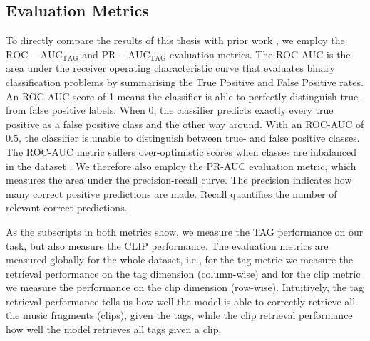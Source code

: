 \subsection{Evaluation Metrics}
To directly compare the results of this thesis with prior work \cite{dieleman2014end,lee2018samplecnn,pons_end--end_2017}, we employ the $\mathrm{ROC-AUC}_{\mathrm{TAG}}$ and $\mathrm{PR-AUC}_{\mathrm{TAG}}$ evaluation metrics. The ROC-AUC is the area under the receiver operating characteristic curve that evaluates binary classification problems by summarising the True Positive and False Positive rates. An ROC-AUC score of 1 means the classifier is able to perfectly distinguish true- from false positive labels. When 0, the classifier predicts exactly every true positive as a false positive class and the other way around. With an ROC-AUC of 0.5, the classifier is unable to distinguish between true- and false positive classes. The ROC-AUC metric suffers over-optimistic scores when classes are inbalanced in the dataset \cite{rocaucimbalance}. We therefore also employ the PR-AUC evaluation metric, which measures the area under the precision-recall curve. The precision indicates how many correct positive predictions are made. Recall quantifies the number of relevant correct predictions.

As the subscripts in both metrics show, we measure the TAG performance on our task, but also measure the CLIP performance. The evaluation metrics are measured globally for the whole dataset, i.e., for the tag metric we measure the retrieval performance on the tag dimension (column-wise) and for the clip metric we measure the performance on the clip dimension (row-wise). Intuitively, the tag retrieval performance tells us how well the model is able to correctly retrieve all the music fragments (clips), given the tags, while the clip retrieval performance how well the model retrieves all tags given a clip.

